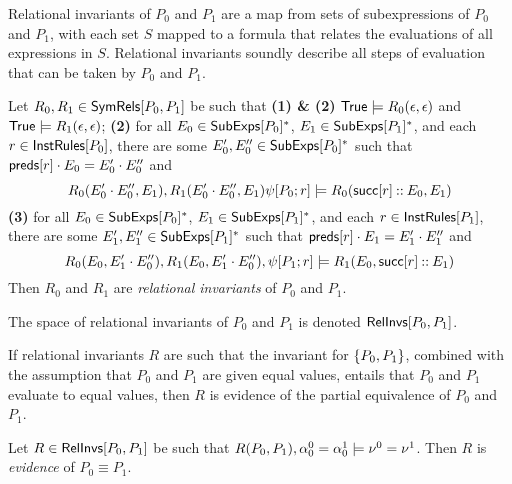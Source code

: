 Relational invariants of $P_0$ and $P_1$ are a map from sets of
subexpressions of $P_0$ and $P_1$, with each set $S$ mapped to a
formula that relates the evaluations of all expressions in $S$.
%
Relational invariants soundly describe all steps of evaluation that
can be taken by $P_0$ and $P_1$.
%
\begin{defn}
  \label{defn:rel-invs}
  Let $R_0, R_1 \in \mathsf{SymRels}[ P_0, P_1 ]$ be such that %
  \textbf{(1) \& (2)} $\mathsf{True} \models R_0(\epsilon, \epsilon)$ and
  $\mathsf{True} \models R_1(\epsilon, \epsilon)$;
  \textbf{(2)} for all $E_0 \in \mathsf{SubExps}[ P_0 ]^{*}$, %
  $E_1 \in \mathsf{SubExps}[ P_1 ]^{*}$, and %
  each $r \in \mathsf{InstRules}[ P_0 ]$, %
  there are some $E_0', E_0'' \in \mathsf{SubExps}[ P_0 ]^{*}$ such that
  $\mathsf{preds}[ r ] \cdot E_0 = E_0' \cdot E_0''$ and
  \[ R_0(E_0' \concat E_0'', E_1), %
  R_1(E_0' \concat E_0'', E_1) %
  \symstep{ P_0 }{ r } \entails R_0(\rulesucc{r} \cons E_0, E_1) \]
  \textbf{(3)} for all $E_0 \in \mathsf{SubExps}[ P_0 ]^{*}$, %
  $E_1 \in \mathsf{SubExps}[ P_1 ]^{*}$, and %
  each $r \in \mathsf{InstRules}[ P_1 ]$, %
  there are some $E_1', E_1'' \in \mathsf{SubExps}[ P_1 ]^{*}$ such that
  $\mathsf{preds}[ r ] \cdot E_1 = E_1' \cdot E_1''$ and
  \[ R_0(E_0, E_1' \concat E_0''), %
  R_1(E_0, E_1' \concat E_0''), %
  \symstep{P_1}{ r } \entails R_1(E_0, \rulesucc{r} \cons E_1) \]
  Then $R_0$ and $R_1$ are \emph{relational invariants} of $P_0$ and
  $P_1$.
\end{defn}
%
The space of relational invariants of $P_0$ and $P_1$ is denoted
$\mathsf{RelInvs}[ P_0, P_1 ]$.

If relational invariants $R$ are such that the invariant for $\{ 
  P_0, P_1  \}$, combined with the assumption that $P_0$ and $P_1$ are
given equal values, entails that $P_0$ and $P_1$ evaluate to equal
values, then $R$ is evidence of the partial equivalence of $P_0$ and
$P_1$.
%
\begin{defn}
  \label{defn:eq-pf}
  Let $R \in \mathsf{RelInvs}[ P_0, P_1 ]$ be such that $R(P_0, P_1), \alpha^0_0
  = \alpha^1_0 \models \nu^0 = \nu^1$.
  Then $R$ is \emph{evidence} of $P_0 \equiv P_1$.
\end{defn}

\begin{ex}
  \label{ex:rel-invs}
\end{ex}

